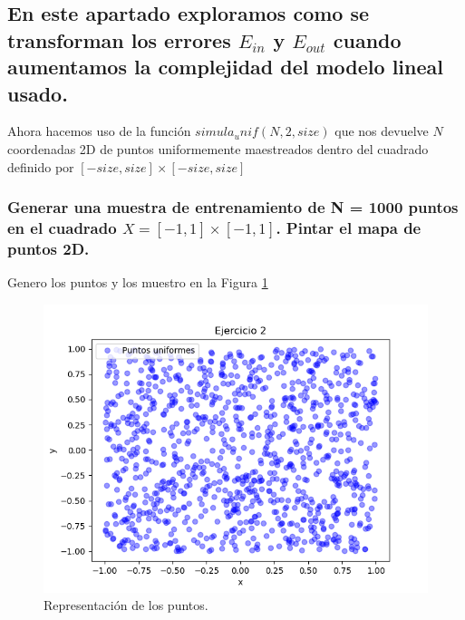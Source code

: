 \documentclass[12pt,a4paper]{article}
\begin{document}
\subsection{En este apartado exploramos como se transforman los errores $E_{in}$  y $E_{out}$ cuando aumentamos la complejidad del modelo lineal usado.}
Ahora hacemos uso de la función $simula_unif (N, 2, size)$ que nos devuelve $N$ coordenadas 2D de puntos uniformemente maestreados dentro del cuadrado definido por $[-size, size] × [-size, size]$
\subsubsection{Generar una muestra de entrenamiento de N = 1000 puntos en el cuadrado $X=[-1, 1] × [-1, 1]$. Pintar el mapa de puntos 2D.}
Genero los puntos y los muestro en la Figura \ref{pic:puntos}

\begin{figure}[H]  %
	
	\centering
	\includegraphics[width=0.7\textheight]{images/puntosEjercicio2.png}  %
	\caption{Representación de los puntos.}
	\label{pic:puntos}
\end{figure}
\end{document}
